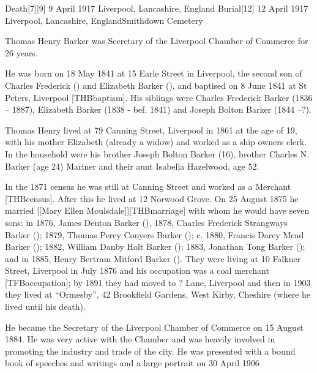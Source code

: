 
Death[7][9] 	9 April 1917 	Liverpool, Lancashire, England
Burial[12] 	12 April 1917 	Liverpool, Lancashire, EnglandSmithdown Cemetery

Thomas Henry Barker was Secretary of the Liverpool Chamber of Commerce for 26 years.\cite{THBbio}

He was born on 18 May 1841\cite{THBbirth} at 15 Earle Street in Liverpool,\cite{THBplantagenets} the second son of Charles Frederick () and Elizabeth Barker (), and baptised on 8 June 1841 at St Peters, Liverpool [THBbaptism].  His siblings were Charles Frederick Barker (1836 -- 1887),  Elizabeth Barker (1838 - bef. 1841) and Joseph Bolton Barker (1844 --?). 

Thomas Henry lived at 79 Canning Street, Liverpool in 1861 at the age of 19, with his mother Elizabeth (already a widow) and worked as a ship owners clerk.  In the household were his brother Joseph Bolton Barker (16), brother Charles N. Barker (age 24) Mariner and their aunt Isabella Hazelwood, age 52.

In the 1871 census he was still at Canning Street and worked as a Merchant [THBcensus]. After this he lived at 12 Norwood Grove.\cite{THBcensus} On 25 August 1875 he married [[Mary Ellen Moulsdale]][THBmarriage] with whom he would have seven sons:\cite{THBplantagenets}
in 1876, James Denton Barker (),
1878, Charles Frederick Strangways Barker ();
1879, Thomas Percy Conyers Barker ();
c. 1880, Francis Darcy Mead Barker ();
1882, William Danby Holt Barker ();
1883, Jonathan Tong Barker (); and in
1885, Henry Bertram Mitford Barker ().
They were living at 10 Falkner Street, Liverpool in July 1876 and his occupation was a coal merchant [TFBoccupation];  by 1891 they had moved to ? Lane, Liverpool\cite{THBresidence} and then in 1903 they lived at ``Ormesby'', 42 Brookfield Gardens, West Kirby, Cheshire (where he lived until his death).\cite{THBdeathcert}

He became the Secretary of the Liverpool Chamber of Commerce on 15 August 1884.  He was very active with the Chamber and was heavily involved in promoting the industry and trade of the city.  He was presented with a bound book of speeches and writings and a large portrait on 30 April 1906

